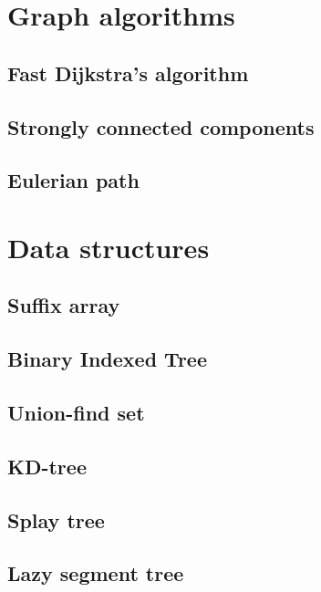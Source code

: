 \chapter{Graph algorithms}
\section{Fast Dijkstra's algorithm}
\raggedbottom
\hrulefill
\section{Strongly connected components}
\raggedbottom
\hrulefill
\section{Eulerian path}
\raggedbottom
\hrulefill

\chapter{Data structures}
\section{Suffix array}
\raggedbottom
\hrulefill
\section{Binary Indexed Tree}
\raggedbottom
\hrulefill
\section{Union-find set}
\raggedbottom
\hrulefill
\section{KD-tree}
\raggedbottom
\hrulefill
\section{Splay tree}
\raggedbottom
\hrulefill
\section{Lazy segment tree}
\raggedbottom
\hrulefill
